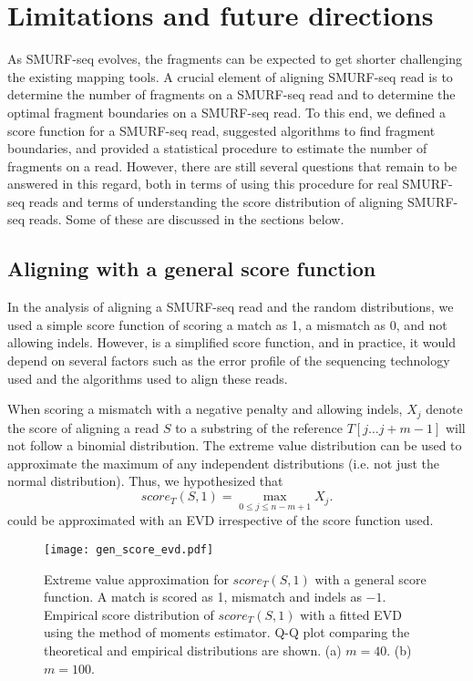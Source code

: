 \section{Limitations and future directions}
As SMURF-seq evolves, the fragments can be expected to get shorter
challenging the existing mapping tools. A crucial element of aligning
SMURF-seq read is to determine the number of fragments on a SMURF-seq
read and to determine the optimal fragment boundaries on a SMURF-seq
read. To this end, we defined a score function for a SMURF-seq read,
suggested algorithms to find fragment boundaries, and provided a
statistical procedure to estimate the number of fragments on a read.
%
However, there are still several questions that remain to be answered in
this regard, both in terms of using this procedure for real SMURF-seq
reads and terms of understanding the score distribution of aligning
SMURF-seq reads. Some of these are discussed in the sections below.


\subsection*{Aligning with a general score function}
In the analysis of aligning a SMURF-seq read and the random
distributions, we used a simple score function of scoring a match as 1, a
mismatch as 0, and not allowing indels. However, is a simplified score
function, and in practice, it would depend on several factors such as
the error profile of the sequencing technology used and the algorithms
used to align these reads.

When scoring a mismatch with a negative penalty and allowing indels,
$X_j$ denote the score of aligning a read $S$ to a substring of the
reference $T[j \dots j+m-1]$ will not follow a binomial distribution.
%
The extreme value distribution can be used to approximate the maximum of
any independent distributions (i.e. not just the normal distribution).
Thus, we hypothesized that \[score_T(S,1) = \max_{0 \leq j \leq n-m+1}
X_j.\]  could be approximated with an EVD irrespective of the score
function used.

\begin{figure}[t!]
\centering
\texttt{[image: gen\_score\_evd.pdf]}
\caption[Extreme value approximation for $score_T(S,1)$ with a general
  score function]{
  Extreme value approximation for $score_T(S,1)$ with a general score
  function. A match is scored as 1, mismatch and indels as $-1$.
  Empirical score distribution of $score_T(S,1)$ with a fitted
  EVD using the method of moments estimator.
  Q-Q plot comparing the theoretical and empirical distributions are shown.
  (a) $m=40$.
  (b) $m=100$.}
\label{gen_score_evd}
\end{figure}

